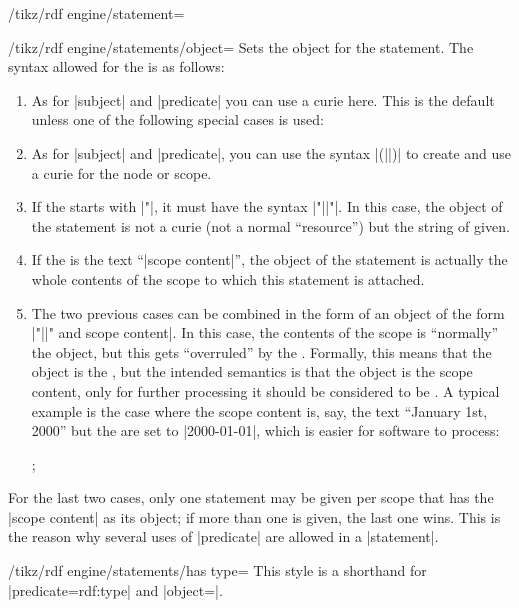 \begin{key}{/tikz/rdf engine/statement=}
    \begin{key}{/tikz/rdf engine/statements/object=}
        Sets the object for the statement. The syntax allowed for the
         is as follows:
        \begin{enumerate}
            \item As for |subject| and |predicate| you can use a curie here.
                This is the default unless one of the following special cases
                is used:
            \item As for |subject| and |predicate|, you can use the syntax
                |(||)| to create and use a curie
                for the node or scope.
            \item If the  starts with |"|, it must have the syntax
                |"||"|. In this case, the object of the
                statement is not a curie (not a normal ``resource'') but the
                string of  given.
            \item If the  is the text ``|scope content|'', the
                object of the statement is actually the whole contents of the
                scope to which this statement is attached.
            \item The two previous cases can be combined in the form of an
                object of the form |"||" and scope content|. In
                this case, the contents of the scope is ``normally'' the
                object, but this gets ``overruled'' by the .
                Formally, this means that the object is the ,
                but the intended semantics is that the object is the scope
                content, only for further processing it should be considered to
                be . A typical example is the case where the
                scope content is, say, the text ``January 1st, 2000'' but the
                 are set to |2000-01-01|, which is easier for
                software to process:
\begin{codeexample}
;
\end{codeexample}
        \end{enumerate}
        For the last two cases, only one statement may be given per scope that
        has the |scope content| as its object; if more than one is given, the
        last one wins. This is the reason why several uses of |predicate| are
        allowed in a |statement|.
    \end{key}

    \begin{key}{/tikz/rdf engine/statements/has type=}
        This style is a shorthand for |predicate=rdf:type| and
        |object=|.
    \end{key}
\end{key}


